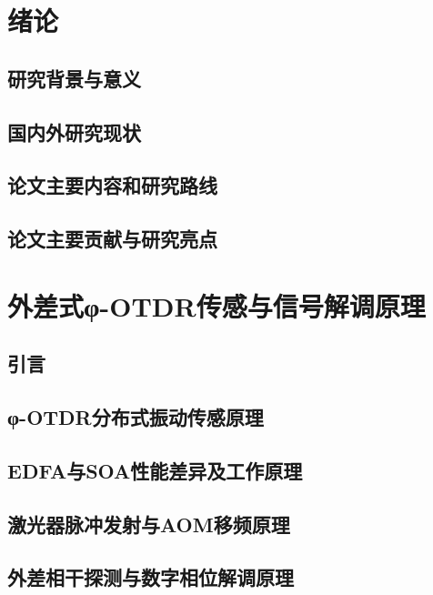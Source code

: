 
\chapter{绪论}
\thispagestyle{main}

\section{研究背景与意义}
\section{国内外研究现状}%
\section{论文主要内容和研究路线}
\section{论文主要贡献与研究亮点}

\chapter{外差式φ-OTDR传感与信号解调原理}
\thispagestyle{main}

\section{引言}
\section{φ-OTDR分布式振动传感原理}
\section{EDFA与SOA性能差异及工作原理}
\section{激光器脉冲发射与AOM移频原理}
\section{外差相干探测与数字相位解调原理}
